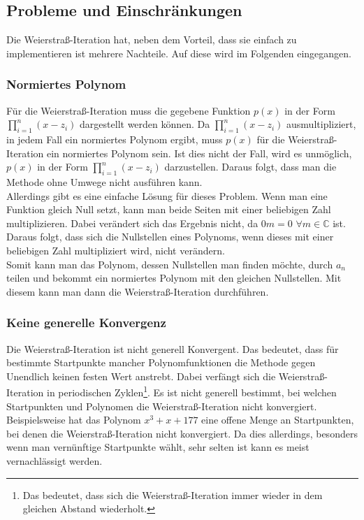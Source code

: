 \documentclass[12pt]{article}
\begin{document}
\subsection{Probleme und Einschränkungen}
Die Weierstraß-Iteration hat, neben dem Vorteil, dass sie einfach zu implementieren ist mehrere Nachteile. Auf diese wird im Folgenden eingegangen.
\subsubsection{Normiertes Polynom}
Für die Weierstraß-Iteration muss die gegebene Funktion $p(x)$ in der Form $\prod_{i=1}^n (x-z_i)$ dargestellt werden können. Da $\prod_{i=1}^n (x-z_i)$ ausmultipliziert, in jedem Fall ein normiertes Polynom ergibt, muss $p(x)$ für die Weierstraß-Iteration ein normiertes Polynom sein.
Ist dies nicht der Fall, wird es unmöglich, $p(x)$ in der Form $\prod_{i=1}^n (x-z_i)$ darzustellen. Daraus folgt, dass man die Methode ohne Umwege nicht ausführen kann. \\
Allerdings gibt es eine einfache Lösung für dieses Problem. Wenn man eine Funktion gleich Null setzt, kann man beide Seiten mit einer beliebigen Zahl multiplizieren. Dabei verändert sich das Ergebnis nicht, da $0m = 0$ \space $\forall m \in \mathbb{C}$ ist. Daraus folgt, dass sich die Nullstellen eines Polynoms, wenn dieses mit einer beliebigen Zahl multipliziert wird, nicht verändern. \\
Somit kann man das Polynom, dessen Nullstellen man finden möchte, durch $a_n$ teilen und bekommt ein normiertes Polynom mit den gleichen Nullstellen. Mit diesem kann man dann die Weierstraß-Iteration durchführen.

\subsubsection{Keine generelle Konvergenz}
Die Weierstraß-Iteration ist nicht generell Konvergent. Das bedeutet, dass für bestimmte Startpunkte mancher Polynomfunktionen die Methode gegen Unendlich keinen festen Wert anstrebt. Dabei verfängt sich die Weierstraß-Iteration in periodischen Zyklen\footnote{Das bedeutet, dass sich die Weierstraß-Iteration immer wieder in dem gleichen Abstand wiederholt.}. Es ist nicht generell bestimmt, bei welchen Startpunkten und Polynomen die Weierstraß-Iteration nicht konvergiert. Beispielsweise hat das Polynom $x^3+x+177$ eine offene Menge an Startpunkten, bei denen die Weierstraß-Iteration nicht konvergiert. Da dies allerdings, besonders wenn man vernünftige Startpunkte wählt, sehr selten ist kann es meist vernachlässigt werden. 
\end{document}
